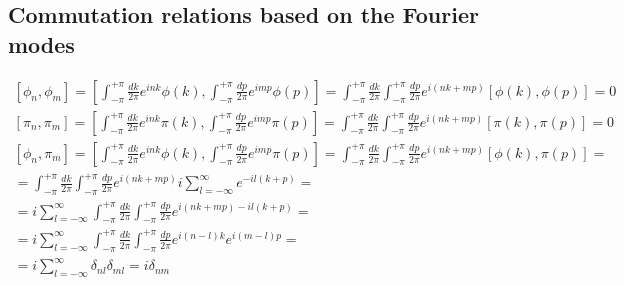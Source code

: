 \documentclass{article}
\begin{document}
\subsection{Commutation relations based on the Fourier modes}
\begin{equation}
\begin{gathered}
    \left[\phi_n, \phi_m\right]
    = \left[\int_{-\pi}^{+\pi} \frac{dk}{2\pi}e^{ink}\phi(k), \int_{-\pi}^{+\pi} \frac{dp}{2\pi}e^{imp}\phi(p)\right]
    = \int_{-\pi}^{+\pi} \frac{dk}{2\pi} \int_{-\pi}^{+\pi}  \frac{dp}{2\pi} e^{i(nk + mp)} \left[\phi(k), \phi(p)\right] = 0 \\
    \left[\pi_n, \pi_m\right]
    = \left[\int_{-\pi}^{+\pi} \frac{dk}{2\pi}e^{ink}\pi(k), \int_{-\pi}^{+\pi} \frac{dp}{2\pi}e^{imp}\pi(p)\right]
    = \int_{-\pi}^{+\pi} \frac{dk}{2\pi} \int_{-\pi}^{+\pi}  \frac{dp}{2\pi} e^{i(nk + mp)} \left[\pi(k), \pi(p)\right] = 0 \\
    \left[\phi_n, \pi_m\right]
    = \left[\int_{-\pi}^{+\pi} \frac{dk}{2\pi}e^{ink}\phi(k), \int_{-\pi}^{+\pi} \frac{dp}{2\pi}e^{imp}\pi(p)\right]
    = \int_{-\pi}^{+\pi} \frac{dk}{2\pi} \int_{-\pi}^{+\pi}  \frac{dp}{2\pi} e^{i(nk + mp)} \left[\phi(k), \pi(p)\right] = \\
    = \int_{-\pi}^{+\pi} \frac{dk}{2\pi} \int_{-\pi}^{+\pi}  \frac{dp}{2\pi} e^{i(nk + mp)} i\sum_{l=-\infty}^{\infty}e^{-il(k + p)} = \\
    = i\sum_{l=-\infty}^{\infty} \int_{-\pi}^{+\pi} \frac{dk}{2\pi} \int_{-\pi}^{+\pi}  \frac{dp}{2\pi} e^{i(nk + mp) - il(k + p)} = \\
    = i\sum_{l=-\infty}^{\infty} \int_{-\pi}^{+\pi} \frac{dk}{2\pi} \int_{-\pi}^{+\pi}  \frac{dp}{2\pi} e^{i(n - l)k}e^{i(m - l)p} = \\
    = i\sum_{l=-\infty}^{\infty} \delta_{nl} \delta_{ml} = i\delta_{nm}  
\end{gathered}
\end{equation}
\end{document}
